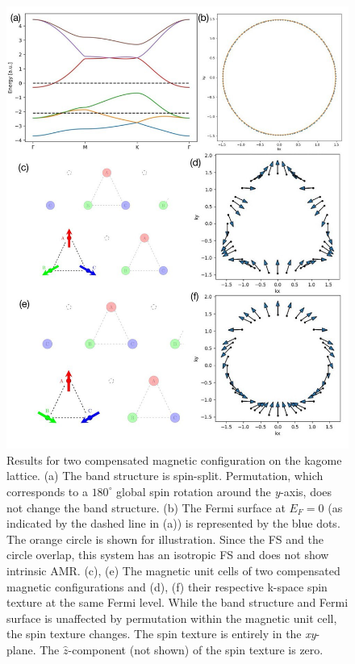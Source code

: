 \documentclass[prb,showpacs,amsmath,amssymb,superscriptaddress,twocolumn,floatfix]{revtex4-1}
\begin{document}
\begin{figure}[h!]
	\centering
	\includegraphics[width=1\linewidth]{img/overview_Kagome_phase1a}
	\caption{Results for two compensated magnetic configuration on the kagome lattice. (a) The band structure is spin-split. Permutation, which corresponds to a $180^\circ$ global spin rotation around the \textit{y}-axis, does not change the band structure. (b) The Fermi surface at $E_F = 0$ (as indicated by the dashed line in (a)) is represented by the blue dots. The orange circle is shown for illustration. Since the FS and the circle overlap, this system has an isotropic FS and does not show intrinsic AMR. (c), (e) The magnetic unit cells of two compensated magnetic configurations and (d), (f) their respective k-space spin texture at the same Fermi level. While the band structure and Fermi surface is unaffected by permutation within the magnetic unit cell, the spin texture changes. The spin texture is entirely in the \textit{xy}-plane. The $\hat{z}$-component (not shown) of the spin texture is zero.}
	\label{fig:totalkagomephase1a}
\end{figure}
\end{document}
